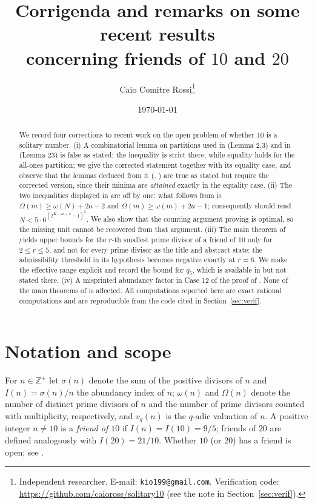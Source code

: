 \documentclass[11pt,a4paper]{article}
\title{Corrigenda and remarks on some recent results\\ concerning friends of $10$ and $20$}
\author{Caio Comitre Rossi\thanks{Independent researcher. E-mail:
\texttt{kio199@gmail.com}. Verification code:
\url{https://github.com/caioross/solitary10} (see the note in Section~\ref{sec:verif}).}}
\date{\today}
\theoremstyle{plain}
\theoremstyle{definition}
\newcommand{\ZZ}{\mathbb{Z}}
\newcommand{\Iab}{I}
\begin{document}
\maketitle

\begin{abstract}
We record four corrections to recent work on the open problem of whether $10$ is a
solitary number. (i) A combinatorial lemma on partitions used in
\cite{CMM10} (Lemma 2.3) and in \cite{CMM20} (Lemma 23) is false as stated: the
inequality is strict there, while equality holds for the all-ones partition; we give
the corrected statement together with its equality case, and observe that the lemmas
deduced from it (\cite[Lemma 3.6]{CMM10}, \cite[Lemma 24]{CMM20}) are true as stated
but require the corrected version, since their minima are \emph{attained} exactly in
the equality case. (ii) The two inequalities displayed in \cite[Remark 3.7]{CMM10}
are off by one: what follows from \cite[Theorem 1.10]{CMM10} is
$\Omega(m)\ge\omega(N)+2a-2$ and $\Omega(m)\ge\omega(m)+2a-1$; consequently
\cite[Corollary 1.11]{CMM10} should read $N<5\cdot 6^{(2^{K-2a+2}-1)^{2}}$. We also
show that the counting argument proving \cite[Theorem 1.10]{CMM10} is optimal, so the
missing unit cannot be recovered from that argument. (iii) The main theorem of
\cite{M10} yields upper bounds for the $r$-th smallest prime divisor of a friend of
$10$ only for $2\le r\le 5$, and not for every prime divisor as the title and
abstract state: the admissibility threshold in its hypothesis becomes negative
exactly at $r=6$. We make the effective range explicit and record the bound for
$q_{5}$, which is available in \cite{M10} but not stated there. (iv) A misprinted
abundancy factor in Case 12 of the proof of \cite[Theorem 1.2]{CMM10}. None of the
main theorems of \cite{CMM10,CMM20,M10} is affected. All computations reported here
are exact rational computations and are reproducible from the code cited in
Section~\ref{sec:verif}.
\end{abstract}

\section{Notation and scope}

For $n\in\ZZ^{+}$ let $\sigma(n)$ denote the sum of the positive divisors of $n$ and
$\Iab(n)=\sigma(n)/n$ the abundancy index of $n$; $\omega(n)$ and $\Omega(n)$ denote
the number of distinct prime divisors of $n$ and the number of prime divisors counted
with multiplicity, respectively, and $v_{q}(n)$ is the $q$-adic valuation of $n$. A
positive integer $n\ne 10$ is a \emph{friend of $10$} if $\Iab(n)=\Iab(10)=9/5$;
friends of $20$ are defined analogously with $\Iab(20)=21/10$. Whether $10$ (or $20$)
has a friend is open; see \cite{Ward,Thackeray,MM,CMM10,CMM20,M10}.
\end{document}
